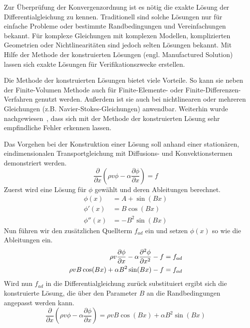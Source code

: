 Zur Überprüfung der Konvergenzordnung ist es nötig die exakte Lösung der Differentialgleichung zu
kennen. Traditionell sind solche Lösungen nur für einfache Probleme oder bestimmte Randbedingungen
und Vereinfachungen bekannt. Für komplexe Gleichungen mit komplexen Modellen, komplizierten Geometrien
oder Nichtlinearitäten sind jedoch selten Lösungen bekannt. Mit Hilfe der Methode der konstruierten
Lösungen (engl. Manufactured Solution) lassen sich exakte Lösungen für Verifikationszwecke erstellen.

Die Methode der konstruierten Lösungen bietet viele Vorteile. So kann sie neben der Finite-Volumen Methode auch
für Finite-Elemente- oder Finite-Differenzen-Verfahren genutzt werden. Außerdem ist sie auch bei nichtlinearen
oder mehreren Gleichungen (z.B. Navier-Stokes-Gleichungen) anwendbar. Weiterhin wurde nachgewiesen~\cite{roache_book},
dass sich mit der Methode der konstruierten Lösung
sehr empfindliche Fehler erkennen lassen.

Das Vorgehen bei der Konstruktion einer Lösung soll anhand einer stationären, eindimensionalen Transportgleichung
mit Diffusions- und Konvektionstermen demonstriert werden.
\begin{equation*}
  \frac{\partial}{\partial x} \left({\rho v \phi
- \alpha \frac{\partial \phi}{\partial x} }\right) = f
\end{equation*}
Zuerst wird eine Lösung für $\phi$ gewählt und deren Ableitungen berechnet.
\begin{align*}
  \phi(x) &= A + \sin(Bx)\\
  \phi'(x) &= B \cos(Bx)\\
  \phi''(x) &= -B^2\sin(Bx)
\end{align*}
Nun führen wir den zusätzlichen Quellterm $f_{ad}$ ein und setzen $\phi(x)$ so wie die Ableitungen ein.
\begin{align*}
  \rho v \pder[\phi]{x} - \alpha\frac{\partial^2 \phi}{\partial x^2}-f&=f_{ad}\\
  \rho v B \cos(Bx) + \alpha B^2 \sin(Bx) - f &= f_{ad}
\end{align*}
Wird nun $f_{ad}$ in die Differentialgleichung zurück substituiert ergibt sich die
konstruierte Lösung, die über den Parameter $B$ an die Randbedingungen angepasst werden kann.
\begin{equation}
   \frac{\partial}{\partial x} \left({\rho v \phi
- \alpha \frac{\partial \phi}{\partial x} }\right)= \rho v B \cos(Bx) + \alpha B^2 \sin(Bx)
\end{equation}

